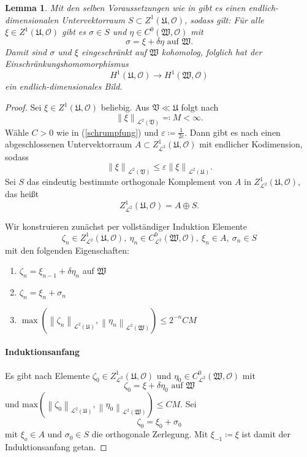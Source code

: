 \documentclass[11pt,a4paper,toc=bibliography]{scrartcl}
\theoremstyle{def}
\theoremstyle{thm}
\newtheorem{lemma}[defi]{Lemma}
\theoremstyle{remark}
\newcommand*{\norm}[1]{\left\lVert#1\right\rVert} %
\begin{document}
\begin{lemma}
Mit den selben Voraussetzungen wie in  gibt es einen endlich-
dimensionalen Untervektorraum $S\subset Z^1(\mathfrak{U},\mathcal{O})$, sodass gilt:
Für alle $\xi\in Z^1(\mathfrak{U},\mathcal{O})$ gibt es $\sigma\in S$ und $\eta\in C^0(\mathfrak{W},\mathcal{O})$ mit
\[
\sigma = \xi +\delta\eta\text{ auf } \mathfrak{W}.
\]
Damit sind $\sigma$ und $\xi$ eingeschränkt auf $\mathfrak{W}$ kohomolog, folglich hat der Einschränkungshomomorphismus 
\[
H^1(\mathfrak{U},\mathcal{O})\rightarrow H^1(\mathfrak{W},\mathcal{O})
\]
ein endlich-dimensionales Bild.
\end{lemma}
\begin{proof}
Sei $\xi\in Z^1(\mathfrak{U},\mathcal{O})$ beliebig. Aus $\mathfrak{V}\ll \mathfrak{U}$ folgt nach 
\[
\norm{\xi}_{\mathcal{L}^2(\mathfrak{V})}\eqqcolon M <\infty.
\]
Wähle $C>0$ wie in (\ref{schrumpfung}) und $\varepsilon\coloneqq \frac{1}{2c}$. Dann gibt es nach  einen abgeschlossenen Untervektorraum $A\subset Z^1_{\mathcal{L}^2}(\mathfrak{U},\mathcal{O})$ mit endlicher Kodimension, sodass
\[
\norm{\xi}_{\mathcal{L}^2(\mathfrak{V})}\leq \varepsilon\norm{\xi}_{\mathcal{L}^2(\mathfrak{U})}.
\]
Sei $S$ das eindeutig bestimmte orthogonale Komplement von $A$ in $Z^1_{\mathcal{L}^2}(\mathfrak{U},\mathcal{O})$, das heißt
\[
Z^1_{\mathcal{L}^2}(\mathfrak{U},\mathcal{O}) = A\oplus S.
\]

Wir konstruieren zunächst per vollständiger Induktion Elemente 
\[
\zeta_n\in Z^1_{\mathcal{L}^2}(\mathfrak{U},\mathcal{O}),~\eta_n\in C^0_{\mathcal{L}^2}(\mathfrak{W},\mathcal{O}),~\xi_n\in A, ~\sigma_n\in S
\]
mit den folgenden Eigenschaften:
\begin{enumerate}
\item $\zeta_n = \xi_{n-1}+\delta \eta_n$ auf $\mathfrak{W}$
\item $\zeta_n = \xi_n+\sigma_n$
\item $\max\left(\norm{\zeta_n}_{\mathcal{L}^2(\mathfrak{U})},\norm{\eta_n}_{\mathcal{L}^2(\mathfrak{W})}\right)\leq 2^{-n}CM$
\end{enumerate}
\paragraph*{Induktionsanfang}
Es gibt nach  Elemente $\zeta_0\in Z^1_{\mathcal{L}^2}(\mathfrak{U},\mathcal{O})$ und $\eta_0\in C^0_{\mathcal{L}^2}(\mathfrak{W},\mathcal{O})$ mit
\[
\zeta_0 = \xi + \delta\eta_0 \text{ auf } \mathfrak{W}
\]
und $\mathrm{max}(\norm{\zeta_0}_{\mathcal{L}^2(\mathfrak{U})},\norm{\eta_0}_{\mathcal{L}^2(\mathfrak{W})})\leq CM.$
Sei
\[
\zeta_0 = \xi_0+\sigma_0
\]
mit $\xi_o\in A$ und $\sigma_0\in S$ die orthogonale Zerlegung.
Mit $\xi_{-1}\coloneqq \xi$ ist damit der Induktionsanfang getan.

\end{proof}
\end{document}
